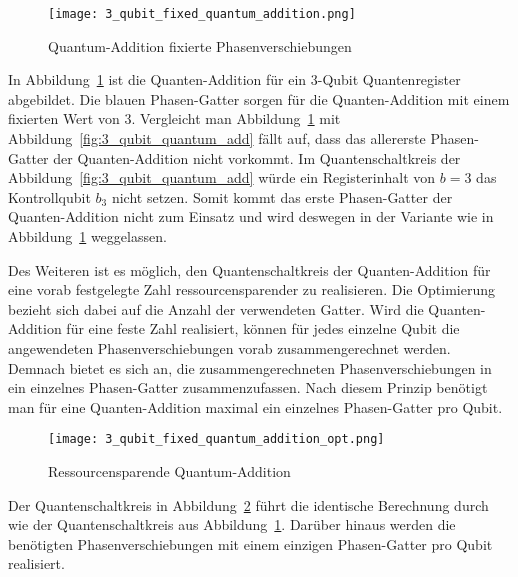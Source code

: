 \begin{figure}[H]
  \centering
  \texttt{[image: 3\_qubit\_fixed\_quantum\_addition.png]}
  \caption{Quantum-Addition fixierte Phasenverschiebungen}
  \label{fig:3_qubit_fixed_quantum_addition}
\end{figure}
In Abbildung~\ref{fig:3_qubit_fixed_quantum_addition} ist die Quanten-Addition für ein 3-Qubit Quantenregister abgebildet.
Die blauen Phasen-Gatter sorgen für die Quanten-Addition mit einem fixierten Wert von \(3\).
Vergleicht man Abbildung~\ref{fig:3_qubit_fixed_quantum_addition} mit Abbildung~\ref{fig:3_qubit_quantum_add} fällt auf, 
dass das allererste Phasen-Gatter der Quanten-Addition nicht vorkommt.
Im Quantenschaltkreis der Abbildung~\ref{fig:3_qubit_quantum_add} würde ein Registerinhalt von \(b = 3\) das Kontrollqubit \(b_3\) nicht setzen. 
Somit kommt das erste Phasen-Gatter der Quanten-Addition nicht zum Einsatz und 
wird deswegen in der Variante wie in Abbildung~\ref{fig:3_qubit_fixed_quantum_addition} weggelassen. 

Des Weiteren ist es möglich, 
den Quantenschaltkreis der Quanten-Addition für eine vorab festgelegte Zahl ressourcensparender zu realisieren.
Die Optimierung bezieht sich dabei auf die Anzahl der verwendeten Gatter.
Wird die Quanten-Addition für eine feste Zahl realisiert, 
können für jedes einzelne Qubit die angewendeten Phasenverschiebungen vorab zusammengerechnet werden.
Demnach bietet es sich an, 
die zusammengerechneten Phasenverschiebungen in ein einzelnes Phasen-Gatter zusammenzufassen.
Nach diesem Prinzip benötigt man für eine Quanten-Addition maximal ein einzelnes Phasen-Gatter pro Qubit.

\begin{figure}[H]
  \centering
  \texttt{[image: 3\_qubit\_fixed\_quantum\_addition\_opt.png]}
  \caption{Ressourcensparende Quantum-Addition}
  \label{fig:3_qubit_fixed_quantum_addition_opt}
\end{figure}
Der Quantenschaltkreis in Abbildung~\ref{fig:3_qubit_fixed_quantum_addition_opt} führt die identische 
Berechnung durch wie der Quantenschaltkreis aus Abbildung~\ref{fig:3_qubit_fixed_quantum_addition}.
Darüber hinaus werden die benötigten Phasenverschiebungen mit einem einzigen Phasen-Gatter pro Qubit realisiert.

